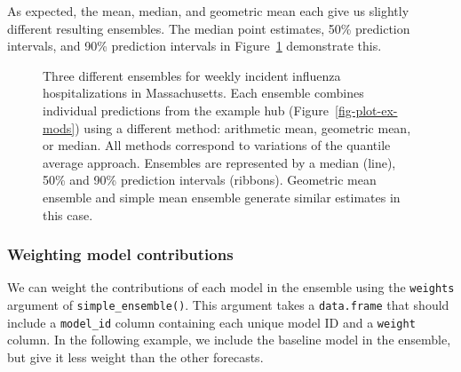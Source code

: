 \documentclass[
]{article}
\begin{document}
As expected, the mean, median, and geometric mean each give us slightly
different resulting ensembles. The median point estimates, 50\%
prediction intervals, and 90\% prediction intervals in
Figure~\ref{fig-plot-ensembles} demonstrate this.

\begin{figure}


\caption{\label{fig-plot-ensembles}Three different ensembles for weekly
incident influenza hospitalizations in Massachusetts. Each ensemble
combines individual predictions from the example hub
(Figure~\ref{fig-plot-ex-mods}) using a different method: arithmetic
mean, geometric mean, or median. All methods correspond to variations of
the quantile average approach. Ensembles are represented by a median
(line), 50\% and 90\% prediction intervals (ribbons). Geometric mean
ensemble and simple mean ensemble generate similar estimates in this
case.}

\end{figure}%

\subsubsection{Weighting model
contributions}\label{weighting-model-contributions}

We can weight the contributions of each model in the ensemble using the
\texttt{weights} argument of \texttt{simple\_ensemble()}. This argument
takes a \texttt{data.frame} that should include a \texttt{model\_id}
column containing each unique model ID and a \texttt{weight} column. In
the following example, we include the baseline model in the ensemble,
but give it less weight than the other forecasts.
\end{document}
